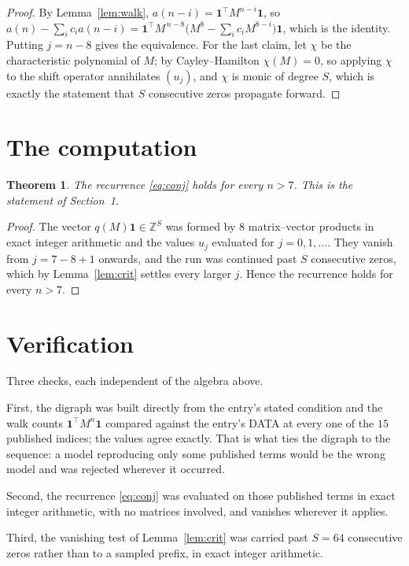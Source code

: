 \documentclass[11pt,a4paper]{article}
\theoremstyle{plain}
\newtheorem{theorem}{Theorem}
\theoremstyle{definition}
\begin{document}
\begin{proof}
By Lemma~\ref{lem:walk}, $a(n-i)=\mathbf{1}^{\!\top}M^{n-i}\mathbf{1}$, so
$a(n)-\sum_i c_i a(n-i)
=\mathbf{1}^{\!\top}M^{\,n-8}\bigl(M^{8}-\sum_i c_i M^{8-i}\bigr)
\mathbf{1}$, which is the identity. Putting $j=n-8$ gives the equivalence. For the
last claim, let $\chi$ be the characteristic polynomial of $M$; by Cayley--Hamilton
$\chi(M)=0$, so applying $\chi$ to the shift operator annihilates $(u_j)$, and $\chi$ is
monic of degree $S$, which is exactly the statement that $S$ consecutive zeros propagate
forward.
\end{proof}

\section{The computation}

\begin{theorem}
The recurrence \eqref{eq:conj} holds for every $n>7$. This is the statement of
Section~1.
\end{theorem}

\begin{proof}
The vector $q(M)\mathbf{1}\in\mathbb{Z}^{S}$ was formed by $8$ matrix--vector
products in exact integer arithmetic and the values $u_j$ evaluated for
$j=0,1,\dots$. They vanish from $j=7-8+1$ onwards, and the run was continued past
$S$ consecutive zeros, which by Lemma~\ref{lem:crit} settles every larger $j$. Hence the
recurrence holds for every $n>7$.
\end{proof}

\section{Verification}

Three checks, each independent of the algebra above.

First, the digraph was built directly from the entry's stated condition and the walk counts
$\mathbf{1}^{\!\top}M^{n}\mathbf{1}$ compared against the entry's DATA at every one of
the $15$ published indices; the values agree exactly. That is what ties the digraph to
the sequence: a model reproducing only some published terms would be the wrong model and
was rejected wherever it occurred.

Second, the recurrence \eqref{eq:conj} was evaluated on those published terms in exact
integer arithmetic, with no matrices involved, and vanishes wherever it applies.

Third, the vanishing test of Lemma~\ref{lem:crit} was carried past $S=64$ consecutive
zeros rather than to a sampled prefix, in exact integer arithmetic.
\end{document}
